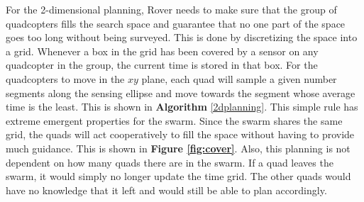 \documentclass[12pt]{article}
\newcommand{\fig}[1]{\textbf{Figure \ref{fig:#1}}}
\begin{document}
For the 2-dimensional planning, Rover needs to make sure that the group of
quadcopters fills the search space and guarantee that no one part of the space
goes too long without being surveyed. This is done by discretizing the space
into a grid. Whenever a box in the grid has been covered by a sensor on any
quadcopter in the group, the current time is stored in that box.  For the
quadcopters to move in the $xy$ plane, each quad will sample a given number
segments along the sensing ellipse and move towards the segment whose average
time is the least. This is shown in \textbf{Algorithm} \ref{2dplanning}. This
simple rule has extreme emergent properties for the swarm. Since the swarm
shares the same grid, the quads will act cooperatively to fill the space
without having to provide much guidance.  This is shown in
\fig{cover}.  Also, this planning is not dependent on how many quads there are
in the swarm.  If a quad leaves the swarm, it would simply no longer update the
time grid. The other quads would have no knowledge that it left and would still
be able to plan accordingly. 
\end{document}
